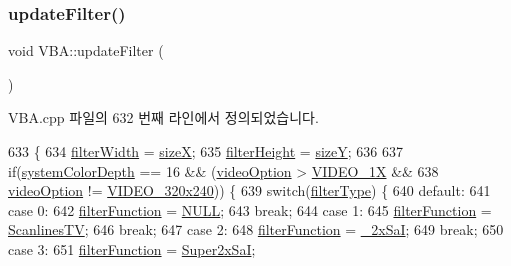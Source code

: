 \subsubsection{\texorpdfstring{update\+Filter()}{updateFilter()}}
{\footnotesize\ttfamily void V\+B\+A\+::update\+Filter (\begin{DoxyParamCaption}{ }\end{DoxyParamCaption})}



V\+B\+A.\+cpp 파일의 632 번째 라인에서 정의되었습니다.


\begin{DoxyCode}
633 \{
634   \mbox{\hyperlink{class_v_b_a_a1ae8b3a4ed9fd2a3783868ae5d38c3bc}{filterWidth}} = \mbox{\hyperlink{class_v_b_a_a7b711f29fd088fa6611d240277a24e9e}{sizeX}};
635   \mbox{\hyperlink{class_v_b_a_a1c5e3ef2e69bfe2a6a877606fbb4de9c}{filterHeight}} = \mbox{\hyperlink{class_v_b_a_acb2e7221985fd0355f105cd1ec42e52e}{sizeY}};
636   
637   \textcolor{keywordflow}{if}(\mbox{\hyperlink{_v_b_a_8cpp_adaf454a4617a00b5cfed14c203ab6efa}{systemColorDepth}} == 16 && (\mbox{\hyperlink{class_v_b_a_a17dac073149c897f770c00ed7098ad32}{videoOption}} > 
      \mbox{\hyperlink{_v_b_a_8h_a531c35e38ede3ea4e5ba5afb24b29493a3730d0de76011ce1f8af8b173ba948b1}{VIDEO\_1X}} &&
638                                 \mbox{\hyperlink{class_v_b_a_a17dac073149c897f770c00ed7098ad32}{videoOption}} != \mbox{\hyperlink{_v_b_a_8h_a531c35e38ede3ea4e5ba5afb24b29493a658665cfbdbd908bdb77babe125d0341}{VIDEO\_320x240}})) \{
639     \textcolor{keywordflow}{switch}(\mbox{\hyperlink{class_v_b_a_a835f54f74420b21459e0f3ce0eacc20d}{filterType}}) \{
640     \textcolor{keywordflow}{default}:
641     \textcolor{keywordflow}{case} 0:
642       \mbox{\hyperlink{class_v_b_a_a8267ca41247e8d752776b57a3f8af011}{filterFunction}} = \mbox{\hyperlink{getopt1_8c_a070d2ce7b6bb7e5c05602aa8c308d0c4}{NULL}};
643       \textcolor{keywordflow}{break};
644     \textcolor{keywordflow}{case} 1:
645       \mbox{\hyperlink{class_v_b_a_a8267ca41247e8d752776b57a3f8af011}{filterFunction}} = \mbox{\hyperlink{_v_b_a_8cpp_a7ccc02429549a515a99becf81560b55e}{ScanlinesTV}};
646       \textcolor{keywordflow}{break};
647     \textcolor{keywordflow}{case} 2:
648       \mbox{\hyperlink{class_v_b_a_a8267ca41247e8d752776b57a3f8af011}{filterFunction}} = \mbox{\hyperlink{_v_b_a_8cpp_a91c01cd7f76003cb2139cf1e475f91c8}{\_2xSaI}};
649       \textcolor{keywordflow}{break};
650     \textcolor{keywordflow}{case} 3:
651       \mbox{\hyperlink{class_v_b_a_a8267ca41247e8d752776b57a3f8af011}{filterFunction}} = \mbox{\hyperlink{_v_b_a_8cpp_a547bc7cb76e394fad839924b59bca105}{Super2xSaI}};

\end{DoxyCode}
